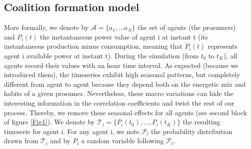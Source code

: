 \documentclass[conference]{IEEEtran}
\begin{document}



\subsection{Coalition formation model}
More formally, we denote by $ \mathcal{A} = \{ a_{1},...a_{N} \} $ the set of agents (the prosumers) and $ P_{i}(t) $ the instantaneous power value of agent i at instant t (its instantaneous production minus consumption, meaning that $ P_{i}(t) $ represents agent i available power at instant t). During the simulation (from $t_{0} $ to $ t_{K} $), all agents record their values with an hour time interval. As expected (because we introduced them), the timeseries exhibit high seasonal patterns, but completely different from agent to agent because they depend both on the energetic mix and habits of a given prosumer. Nevertheless, these macro variations can hide the interesting information in the correlation coefficients and twist the rest of our process. Thereby, we remove these seasonal effects for all agents (see second block of figure \ref{Fig1}). We denote by $ \mathcal{T}_{i} = \{ P_{i}(t_{0}),...,P_{i}(t_{K}) \} $ the resulting timeserie for  agent i. For any agent i, we note $ \mathcal{P}_{i} $ the probability distribution drawn from $ \mathcal{T}_{i} $ and by $ P_{i} $ a random variable following $ \mathcal{P}_{i} $.
\end{document}
